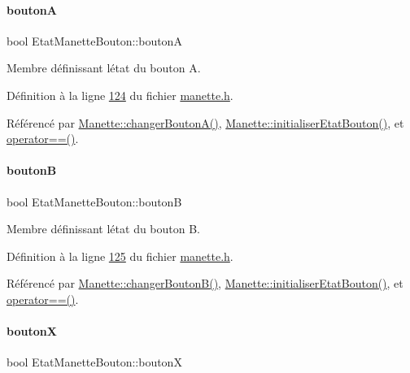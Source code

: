 \paragraph{\texorpdfstring{boutonA}{boutonA}}
{\footnotesize\ttfamily bool Etat\+Manette\+Bouton\+::boutonA}



Membre définissant l\textquotesingle{}état du bouton A. 



Définition à la ligne \hyperlink{manette_8h_source_l00124}{124} du fichier \hyperlink{manette_8h_source}{manette.\+h}.



Référencé par \hyperlink{manette_8cpp_source_l00551}{Manette\+::changer\+Bouton\+A()}, \hyperlink{manette_8cpp_source_l00313}{Manette\+::initialiser\+Etat\+Bouton()}, et \hyperlink{manette_8cpp_source_l00594}{operator==()}.

\mbox{\label{struct_etat_manette_bouton_a2a0f4d809b1b9b814fa689113becaad7}} 
\paragraph{\texorpdfstring{boutonB}{boutonB}}
{\footnotesize\ttfamily bool Etat\+Manette\+Bouton\+::boutonB}



Membre définissant l\textquotesingle{}état du bouton B. 



Définition à la ligne \hyperlink{manette_8h_source_l00125}{125} du fichier \hyperlink{manette_8h_source}{manette.\+h}.



Référencé par \hyperlink{manette_8cpp_source_l00558}{Manette\+::changer\+Bouton\+B()}, \hyperlink{manette_8cpp_source_l00313}{Manette\+::initialiser\+Etat\+Bouton()}, et \hyperlink{manette_8cpp_source_l00594}{operator==()}.

\mbox{\label{struct_etat_manette_bouton_a4a1d74300413624fd13841eb11c6e974}} 
\paragraph{\texorpdfstring{boutonX}{boutonX}}
{\footnotesize\ttfamily bool Etat\+Manette\+Bouton\+::boutonX}



